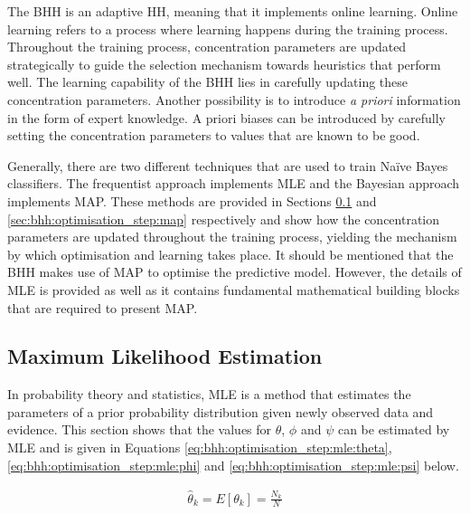 The \acs{BHH} is an adaptive \ac{HH}, meaning that it implements online learning. Online learning refers to a process where learning happens during the training process. Throughout the training process, concentration parameters are updated strategically to guide the selection mechanism towards heuristics that perform well. The learning capability of the \acs{BHH} lies in carefully updating these concentration parameters. Another possibility is to introduce \textit{a priori} information in the form of expert knowledge. A priori biases can be introduced by carefully setting the concentration parameters to values that are known to be good.

Generally, there are two different techniques that are used to train Naïve Bayes classifiers. The frequentist approach implements \acf{MLE} and the Bayesian approach implements \acf{MAP}. These methods are provided in Sections \ref{sec:bhh:optimisation_step:mle} and \ref{sec:bhh:optimisation_step:map} respectively and show how the concentration parameters are updated throughout the training process, yielding the mechanism by which optimisation and learning takes place. It should be mentioned that the \acs{BHH} makes use of \acs{MAP} to optimise the predictive model. However, the details of \acs{MLE} is provided as well as it contains fundamental mathematical building blocks that are required to present \acs{MAP}.


\subsection{Maximum Likelihood Estimation}\label{sec:bhh:optimisation_step:mle}

In probability theory and statistics, \acf{MLE} is a method that estimates the parameters of a prior probability distribution given newly observed data and evidence. This section shows that the values for $\theta$, $\phi$ and $\psi$ can be estimated by \ac{MLE} and is given in Equations \eqref{eq:bhh:optimisation_step:mle:theta}, \eqref{eq:bhh:optimisation_step:mle:phi} and \eqref{eq:bhh:optimisation_step:mle:psi} below.

\begin{equation}
      \label{eq:bhh:optimisation_step:mle:theta}
      \begin{split}
            \hat{\theta}_{k} = E[\theta_{k}] = \frac{N_{k}}{N}
      \end{split}
\end{equation}

